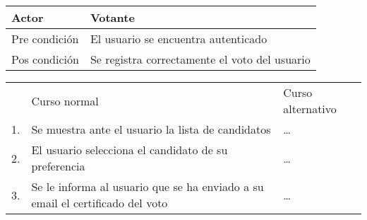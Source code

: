 \documentclass{article}
\begin{document}
\begin{tabular}{ll}
Actor & Votante \\
\hline
Pre condición & El usuario se encuentra autenticado \\
\hline
Pos condición & Se registra correctamente el voto del usuario \\
\hline
\end{tabular}




\begin{tabular}{c p{4cm}|p{4cm}}
 & Curso normal & Curso alternativo \\
 1. & Se muestra ante el usuario la lista de candidatos & \ldots \\
 2. & El usuario selecciona el candidato de su preferencia & \ldots \\
 3. & Se le informa al usuario que se ha enviado a su e\-mail el certificado del voto & \ldots \\

\end{tabular}
\end{document}
